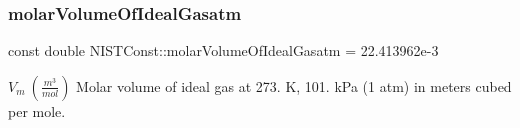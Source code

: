 \subsubsection{\texorpdfstring{molar\+Volume\+Of\+Ideal\+Gasatm}{molarVolumeOfIdealGasatm}}
{\footnotesize\ttfamily const double N\+I\+S\+T\+Const\+::molar\+Volume\+Of\+Ideal\+Gasatm = 22.\+413962e-\/3}

$V_m \ (\frac{m^3}{mol})$ Molar volume of ideal gas at 273. K, 101. k\+Pa (1 atm) in meters cubed per mole. 